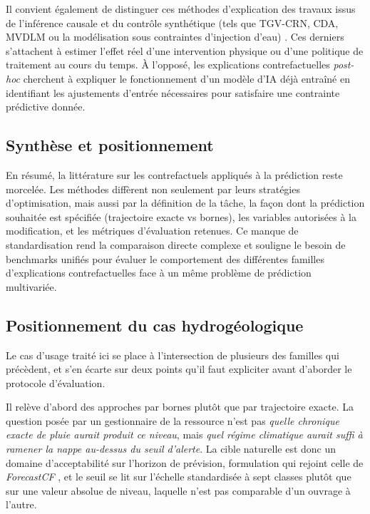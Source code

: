 Il convient également de distinguer ces méthodes d'explication des travaux issus de l'inférence causale et du contrôle synthétique (tels que TGV-CRN, CDA, MVDLM ou la modélisation sous contraintes d'injection d'eau) \cite{fujii2025estimating, min2024domain, li2024compositional, wen2025dynamical}. Ces derniers s'attachent à estimer l'effet réel d'une intervention physique ou d'une politique de traitement au cours du temps. À l'opposé, les explications contrefactuelles \textit{post-hoc} cherchent à expliquer le fonctionnement d'un modèle d'IA déjà entraîné en identifiant les ajustements d'entrée nécessaires pour satisfaire une contrainte prédictive donnée.

\subsection{Synthèse et positionnement}

En résumé, la littérature sur les contrefactuels appliqués à la prédiction reste morcelée. Les méthodes diffèrent non seulement par leurs stratégies d'optimisation, mais aussi par la définition de la tâche, la façon dont la prédiction souhaitée est spécifiée (trajectoire exacte vs bornes), les variables autorisées à la modification, et les métriques d'évaluation retenues. Ce manque de standardisation rend la comparaison directe complexe et souligne le besoin de benchmarks unifiés pour évaluer le comportement des différentes familles d'explications contrefactuelles face à un même problème de prédiction multivariée.

\subsection{Positionnement du cas hydrogéologique}

Le cas d'usage traité ici se place à l'intersection de plusieurs des familles qui précèdent, et s'en écarte sur deux points qu'il faut expliciter avant d'aborder le protocole d'évaluation.

Il relève d'abord des approches par bornes plutôt que par trajectoire exacte. La question posée par un gestionnaire de la ressource n'est pas \emph{quelle chronique exacte de pluie aurait produit ce niveau}, mais \emph{quel régime climatique aurait suffi à ramener la nappe au-dessus du seuil d'alerte}. La cible naturelle est donc un domaine d'acceptabilité sur l'horizon de prévision, formulation qui rejoint celle de \textit{ForecastCF} \cite{wang2023forecastcf}, et le seuil se lit sur l'échelle standardisée à sept classes plutôt que sur une valeur absolue de niveau, laquelle n'est pas comparable d'un ouvrage à l'autre.


